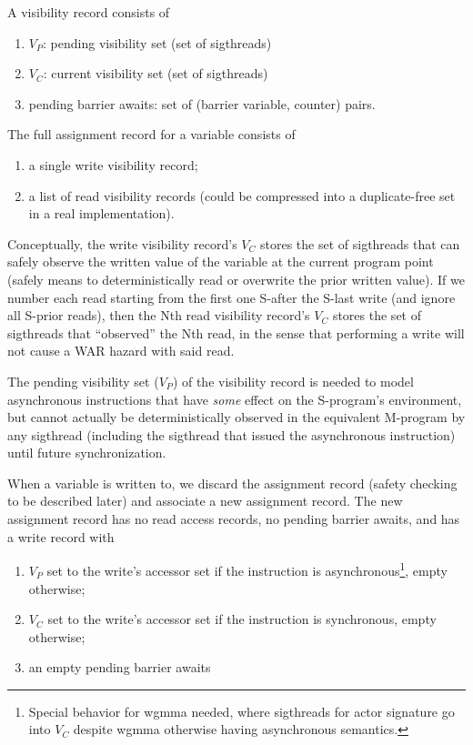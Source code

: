 \filbreak
{} A visibility record consists of
\begin{enumerate}
  \item $V_P$: pending visibility set (set of sigthreads)
  \item $V_C$: current visibility set (set of sigthreads)
  \item pending barrier awaits: set of (barrier variable, counter) pairs.
\end{enumerate}

\filbreak
{} The full assignment record for a variable consists of
\begin{enumerate}
  \item a single write visibility record;
  \item a list of read visibility records (could be compressed into a duplicate-free set in a real implementation).
\end{enumerate}

\filbreak
Conceptually, the write visibility record's $V_C$ stores the set of sigthreads that can safely observe the written value of the variable at the current program point (safely means to deterministically read or overwrite the prior written value).
If we number each read starting from the first one S-after the S-last write (and ignore all S-prior reads), then the Nth read visibility record's $V_C$ stores the set of sigthreads that ``observed'' the Nth read, in the sense that performing a write will not cause a WAR hazard with said read.

\filbreak
The pending visibility set ($V_P$) of the visibility record is needed to model asynchronous instructions that have \textit{some} effect on the S-program's environment, but cannot actually be deterministically observed in the equivalent M-program by any sigthread (including the sigthread that issued the asynchronous instruction) until future synchronization.

\filbreak
{} When a variable is written to, we discard the assignment record (safety checking to be described later) and associate a new assignment record.
The new assignment record has no read access records, no pending barrier awaits, and has a write record with

\filbreak
\begin{enumerate}
  \item $V_P$ set to the write's accessor set if the instruction is asynchronous\footnote{Special behavior for wgmma needed, where sigthreads for actor signature  go into $V_C$ despite wgmma otherwise having asynchronous semantics.}, empty otherwise;
  \item $V_C$ set to the write's accessor set if the instruction is synchronous, empty otherwise;
  \item an empty pending barrier awaits
\end{enumerate}

